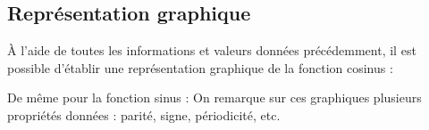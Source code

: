 	\subsection{Représentation graphique}

	À l'aide de toutes les informations et valeurs données précédemment, il est possible d'établir une représentation graphique de la fonction cosinus :

	De même pour la fonction sinus :
	On remarque sur ces graphiques plusieurs propriétés données : parité, signe, périodicité, etc.

